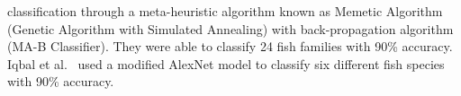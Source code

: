 \documentclass[screen,review]{acmart}
\begin{document}
classification through a meta-heuristic algorithm known as Memetic Algorithm (Genetic Algorithm with Simulated Annealing) with back-propagation algorithm (MA-B Classifier). They were able to classify 24 fish families with 90\%
accuracy.
Iqbal et al.~\cite{Iqbal2021AutomaticFS} used a modified
AlexNet \cite{AlexNet2012} model to classify six different fish species
with 90\% accuracy.
\end{document}
